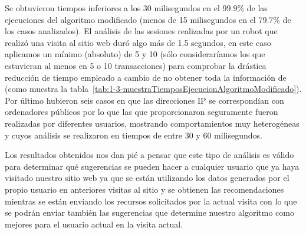 Se obtuvieron tiempos inferiores a los 30 milisegundos en el 99.9\% de las ejecuciones del algoritmo modificado (menos de 15 milisegundos en el 79.7\% de los casos analizados). El análisis de las sesiones realizadas por un robot que realizó una visita al sitio web duró algo más de 1.5 segundos, en este caso aplicamos un \soporte mínimo (absoluto) de 5 y 10 (sólo consideraríamos los \itemsets que estuvieran al menos en 5 o 10 transacciones) para comprobar la drástica reducción de tiempo empleado a cambio de no obtener toda la información de \D (como muestra la tabla~\ref{tab:1-3-muestraTiemposEjecucionAlgoritmoModificado}). Por último hubieron seis casos en que las direcciones IP se correspondían con ordenadores públicos por lo que las \sns que proporcionaron seguramente fueron realizadas por diferentes usuarios, mostrando comportamientos muy heterogéneas y cuyos análisis se realizaron en tiempos de entre 30 y 60 milisegundos.

Los resultados obtenidos nos dan pié a pensar que este tipo de análisis es válido para determinar qué sugerencias se pueden hacer a cualquier usuario que ya haya visitado nuestro sitio web ya que se están utilizando los datos generados por el propio usuario en anteriores visitas al sitio y se obtienen las recomendaciones mientras se están enviando los recursos solicitados por la actual visita con lo que se podrán enviar también las sugerencias que determine nuestro algoritmo como mejores para el usuario actual en la visita actual.